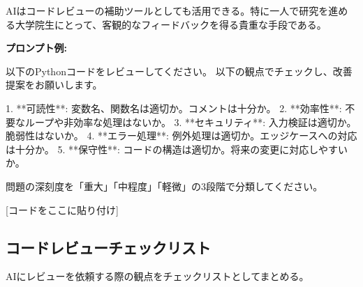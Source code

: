 AIはコードレビューの補助ツールとしても活用できる。特に一人で研究を進める大学院生にとって、客観的なフィードバックを得る貴重な手段である。

\textbf{プロンプト例:}

\begin{promptbox}
以下のPythonコードをレビューしてください。
以下の観点でチェックし、改善提案をお願いします。

1. **可読性**: 変数名、関数名は適切か。コメントは十分か。
2. **効率性**: 不要なループや非効率な処理はないか。
3. **セキュリティ**: 入力検証は適切か。脆弱性はないか。
4. **エラー処理**: 例外処理は適切か。エッジケースへの対応は十分か。
5. **保守性**: コードの構造は適切か。将来の変更に対応しやすいか。

問題の深刻度を「重大」「中程度」「軽微」の3段階で分類してください。

{[}コードをここに貼り付け]
\end{promptbox}

\subsection{コードレビューチェックリスト}

AIにレビューを依頼する際の観点をチェックリストとしてまとめる。

